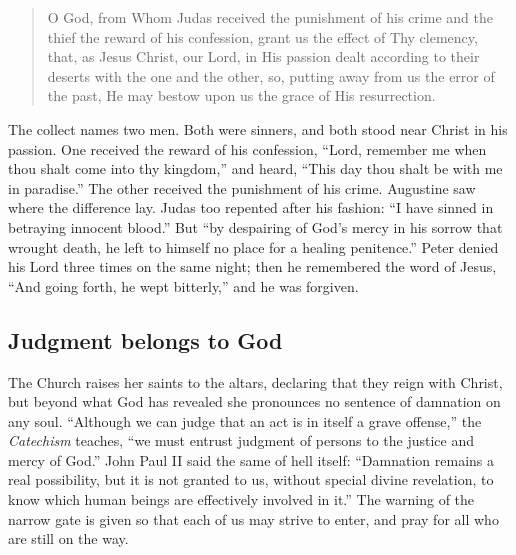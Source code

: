 \begin{quote}

O God, from Whom Judas received the punishment of his crime and the thief the reward of his confession, grant us the effect of Thy clemency, that, as Jesus Christ, our Lord, in His passion dealt according to their deserts with the one and the other, so, putting away from us the error of the past, He may bestow upon us the grace of His resurrection.
\end{quote}

The collect names two men. Both were sinners, and both stood near Christ in his passion. One received the reward of his confession, ``Lord, remember me when thou shalt come into thy kingdom,'' and heard, ``This day thou shalt be with me in paradise.'' The other received the punishment of his crime. Augustine saw where the difference lay. Judas too repented after his fashion: ``I have sinned in betraying innocent blood.'' But ``by despairing of God's mercy in his sorrow that wrought death, he left to himself no place for a healing penitence.'' Peter denied his Lord three times on the same night; then he remembered the word of Jesus, ``And going forth, he wept bitterly,'' and he was forgiven.

\subsection{Judgment belongs to God}

The Church raises her saints to the altars, declaring that they reign with Christ, but beyond what God has revealed she pronounces no sentence of damnation on any soul. ``Although we can judge that an act is in itself a grave offense,'' the \emph{Catechism} teaches, ``we must entrust judgment of persons to the justice and mercy of God.'' John Paul II said the same of hell itself: ``Damnation remains a real possibility, but it is not granted to us, without special divine revelation, to know which human beings are effectively involved in it.'' The warning of the narrow gate is given so that each of us may strive to enter, and pray for all who are still on the way.
